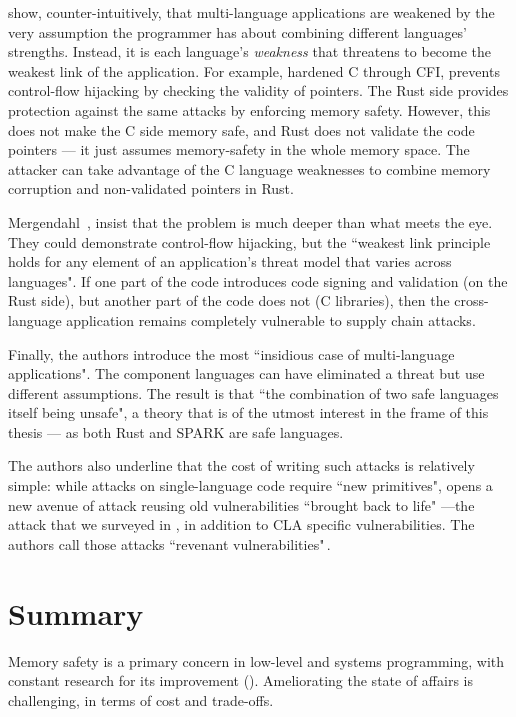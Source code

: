 \documentclass[nomenclature, english, bibtex]{kththesis}
\begin{document}
 show, counter-intuitively, that multi-language applications are weakened by the very assumption the programmer has about combining different languages' strengths. Instead, it is each language's \emph{weakness} that threatens to become the weakest link of the application.
For example, hardened C through \gls{CFI}, prevents control-flow hijacking by checking the validity of pointers. The Rust side provides protection against the same attacks by enforcing memory safety. However, this does not make the C side memory safe, and Rust does not validate the code pointers --- it just assumes \gls{memory-safety} in the whole memory space. The attacker can take advantage of the C language weaknesses to combine memory corruption and non-validated pointers in Rust. 

Mergendahl \etal\,\cite{mergendahl_cross-language_2022}, insist that the problem is much deeper than what meets the eye. They could demonstrate control-flow hijacking, but the ``weakest link principle holds for any element of an application’s threat model that varies across languages". If one part of the code introduces code signing and validation (on the Rust side), but another part of the code does not (C libraries), then the cross-language application remains completely vulnerable to supply chain attacks.

Finally, the authors introduce the most ``insidious case of multi-language applications". The component languages can have eliminated a threat but use different assumptions. The result is that ``the combination of two safe languages itself being unsafe", a theory that is of the utmost interest in the frame of this thesis --- as both Rust and SPARK are safe languages.

The authors also underline that the cost of writing such attacks is relatively simple: while attacks on single-language code require ``new primitives",  opens a new avenue of attack reusing old vulnerabilities ``brought back to life" ---the attack that we surveyed in , in addition to CLA specific vulnerabilities. The authors call those attacks ``revenant vulnerabilities"\,\cite{mergendahl_cross-language_2022}. 

\section{Summary}

Memory safety is a primary concern in low-level and systems programming, with constant research for its improvement (). Ameliorating the state of affairs is challenging, in terms of cost and trade-offs.
\end{document}
